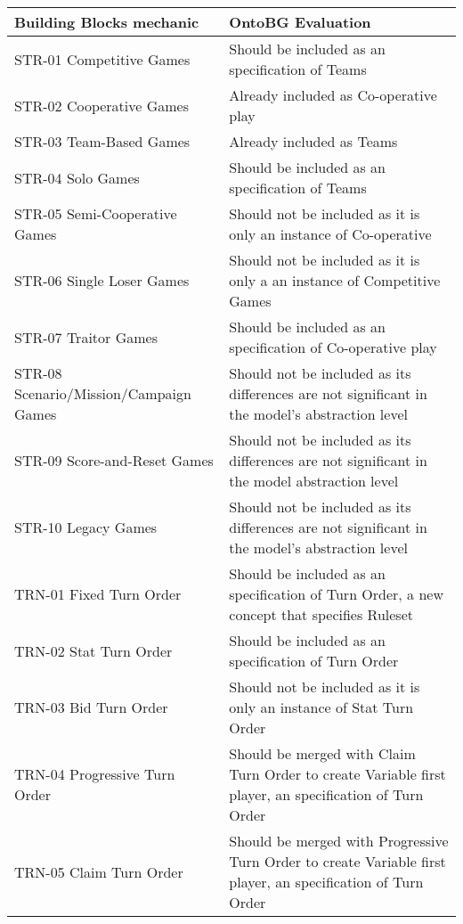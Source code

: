     \begin{longtable}{|m{7cm}|m{7cm}|}
        \hline
        Building Blocks mechanic & OntoBG Evaluation \\
        \hline
        STR-01 Competitive Games & Should be included as an specification of Teams\\
        \hline
        STR-02 Cooperative Games & Already included as Co-operative play \\
        \hline
        STR-03 Team-Based Games & Already included as Teams \\
        \hline
        STR-04 Solo Games & Should be included as an specification of Teams \\
        \hline
        STR-05 Semi-Cooperative Games & Should not be included as it is only an instance of Co-operative  \\
        \hline
        STR-06 Single Loser Games & Should not be included as it is only a an instance of Competitive Games \\
        \hline
        STR-07 Traitor Games & Should be included as an specification of Co-operative play \\
        \hline
        STR-08 Scenario/Mission/Campaign Games & Should not be included as its differences are not significant in the model's abstraction level \\
        \hline
        STR-09 Score-and-Reset Games & Should not be included as its differences are not significant in the model abstraction level \\
        \hline
        STR-10 Legacy Games & Should not be included as its differences are not significant in the model's abstraction level \\
        \hline
        TRN-01 Fixed Turn Order & Should be included as an specification of Turn Order, a new concept that specifies Ruleset  \\
        \hline
        TRN-02 Stat Turn Order & Should be included as an specification of Turn Order \\
        \hline
        TRN-03 Bid Turn Order & Should not be included as it is only an instance of Stat Turn Order \\
        \hline
        TRN-04 Progressive Turn Order & Should be merged with Claim Turn Order to create Variable first player, an specification of Turn Order\\
        \hline
        TRN-05 Claim Turn Order & Should be merged with Progressive Turn Order to create Variable first player, an specification of Turn Order \\

\end{longtable}

